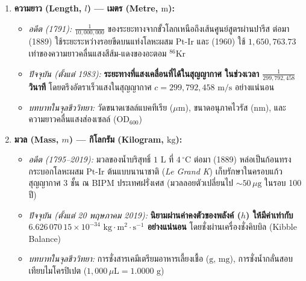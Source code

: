 \begin{enumerate}
    \item \textbf{ความยาว (Length, $l$) --- เมตร (Metre, $\text{m}$):}
    \begin{itemize}
        \item \textit{อดีต (1791):} $\tfrac{1}{10{,}000{,}000}$ ของระยะทางจากขั้วโลกเหนือถึงเส้นศูนย์สูตรผ่านปารีส ต่อมา (1889) ใช้ระยะระหว่างรอยขีดบนแท่งโลหะผสม $\text{Pt-Ir}$ และ (1960) ใช้ $1{,}650{,}763.73$ เท่าของความยาวคลื่นแสงสีส้ม-แดงของอะตอม $^{86}\text{Kr}$
        \item \textit{ปัจจุบัน (ตั้งแต่ 1983):} \textbf{ระยะทางที่แสงเคลื่อนที่ได้ในสุญญากาศ ในช่วงเวลา $\frac{1}{299{,}792{,}458}$ วินาที} โดยตรึงอัตราเร็วแสงในสุญญากาศ $c = 299{,}792{,}458\text{ m/s}$ อย่างแน่นอน
        \item \textit{บทบาทในจุลชีววิทยา:} วัดขนาดเซลล์แบคทีเรีย ($\mu\text{m}$), ขนาดอนุภาคไวรัส ($\text{nm}$), และความยาวคลื่นแสงส่องเซลล์ ($\text{OD}_{600}$)
    \end{itemize}

    \item \textbf{มวล (Mass, $m$) --- กิโลกรัม (Kilogram, $\text{kg}$):}
    \begin{itemize}
        \item \textit{อดีต (1795--2019):} มวลของน้ำบริสุทธิ์ $1\text{ L}$ ที่ $4\,^\circ\text{C}$ ต่อมา (1889) หล่อเป็นก้อนทรงกระบอกโลหะผสม $\text{Pt-Ir}$ ต้นแบบนานาชาติ (\textit{Le Grand K}) เก็บรักษาในครอบแก้วสุญญากาศ 3 ชั้น ณ BIPM ประเทศฝรั่งเศส (มวลลอยตัวเปลี่ยนไป $\sim 50\,\mu\text{g}$ ในรอบ 100 ปี)
        \item \textit{ปัจจุบัน (ตั้งแต่ 20 พฤษภาคม 2019):} \textbf{นิยามผ่านค่าคงตัวของพลังค์ ($h$) ให้มีค่าเท่ากับ $6.626\,070\,15 \times 10^{-34}\text{ kg}\cdot\text{m}^2\cdot\text{s}^{-1}$ อย่างแน่นอน} โดยชั่งผ่านเครื่องชั่งคิบบิล (Kibble Balance)
        \item \textit{บทบาทในจุลชีววิทยา:} การชั่งสารเคมีเตรียมอาหารเลี้ยงเชื้อ ($\text{g, mg}$), การชั่งน้ำกลั่นสอบเทียบไมโครปิเปต ($1{,}000\,\mu\text{L} = 1.0000\text{ g}$)
    \end{itemize}


\end{enumerate}
